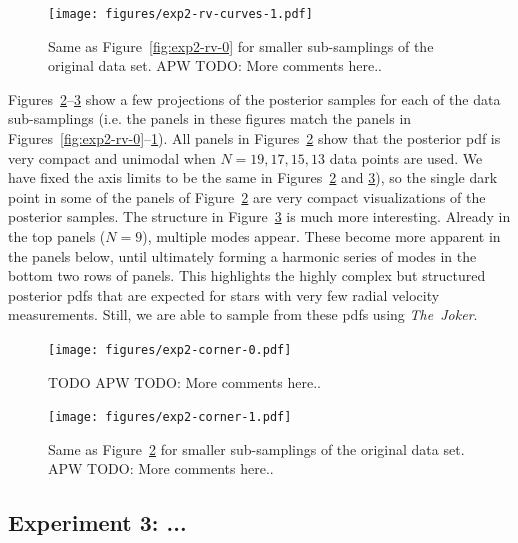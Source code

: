 \documentclass[manuscript, letterpaper]{aastex6}
\newcommand{\project}[1]{\textsl{#1}}
\newcommand{\samplername}{\project{The~Joker}}
\newcommand{\todoapw}[1]{{\color{red}APW TODO: #1}}
\begin{document}
\begin{figure}[p]
\begin{center}
\texttt{[image: figures/exp2-rv-curves-1.pdf]}
\end{center}
\caption{%
Same as Figure~\ref{fig:exp2-rv-0} for smaller sub-samplings of the original
data set.
\todoapw{More comments here..}
\label{fig:exp2-rv-1}}
\end{figure}

Figures~\ref{fig:exp2-corner-0}--\ref{fig:exp2-corner-1} show a few projections
of the posterior samples for each of the data sub-samplings (i.e. the panels in
these figures match the panels in
Figures~\ref{fig:exp2-rv-0}--\ref{fig:exp2-rv-1}).
All panels in Figures~\ref{fig:exp2-corner-0} show that the posterior pdf is
very compact and unimodal when $N=19,17,15,13$ data points are used.
We have fixed the axis limits to be the same in Figures~\ref{fig:exp2-corner-0}
and \ref{fig:exp2-corner-1}), so the single dark point in some of the panels of
Figure~\ref{fig:exp2-corner-0} are very compact visualizations of the posterior
samples.
The structure in Figure~\ref{fig:exp2-corner-1} is much more interesting.
Already in the top panels ($N=9$), multiple modes appear.
These become more apparent in the panels below, until ultimately forming a
harmonic series of modes in the bottom two rows of panels.
This highlights the highly complex but structured posterior pdfs that are
expected for stars with very few radial velocity measurements.
Still, we are able to sample from these pdfs using \samplername.

\begin{figure}[p]
\begin{center}
\texttt{[image: figures/exp2-corner-0.pdf]}
\end{center}
\caption{%
TODO
\todoapw{More comments here..}
\label{fig:exp2-corner-0}}
\end{figure}

\begin{figure}[p]
\begin{center}
\texttt{[image: figures/exp2-corner-1.pdf]}
\end{center}
\caption{%
Same as Figure~\ref{fig:exp2-corner-0} for smaller sub-samplings of the original
data set.
\todoapw{More comments here..}
\label{fig:exp2-corner-1}}
\end{figure}

\subsection{Experiment 3: ...}
\end{document}
